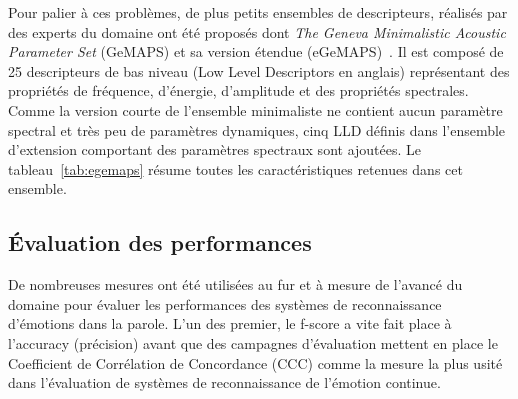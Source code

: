 Pour palier à ces problèmes, de plus petits ensembles de descripteurs, réalisés par des experts du domaine ont été proposés dont \textit{The Geneva Minimalistic Acoustic Parameter Set} (GeMAPS) et sa version étendue (eGeMAPS)~\cite{Eyben2016}. Il est composé de 25 descripteurs de bas niveau (Low Level Descriptors en anglais)  représentant des propriétés de fréquence, d’énergie, d’amplitude et des propriétés spectrales. Comme la version courte de l’ensemble minimaliste ne contient aucun paramètre spectral et très peu de paramètres dynamiques, cinq LLD définis dans l’ensemble d’extension comportant des paramètres spectraux sont ajoutées. Le tableau~\ref{tab:egemaps} résume toutes les caractéristiques retenues dans cet ensemble.





\subsection{Évaluation des performances}
De nombreuses mesures ont été utilisées au fur et à mesure de l'avancé du domaine pour évaluer les performances des systèmes de reconnaissance d'émotions dans la parole. L'un des premier, le f-score a vite fait place à l'accuracy (précision) avant que des campagnes d'évaluation mettent en place le Coefficient de Corrélation de Concordance (CCC) comme la mesure la plus usité dans l'évaluation de systèmes de reconnaissance de l'émotion continue.

